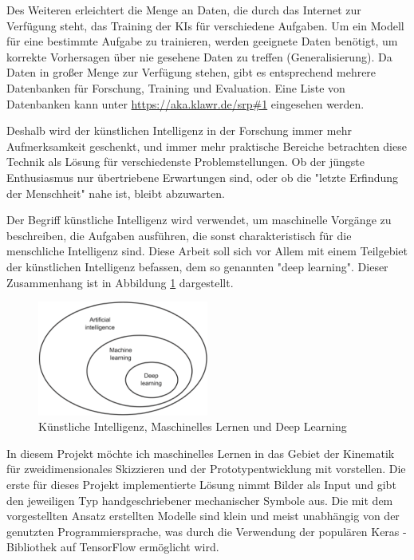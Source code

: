 Des Weiteren erleichtert die Menge an Daten, die durch das Internet zur Verfügung steht, das Training der KIs für verschiedene Aufgaben.
Um ein Modell für eine bestimmte Aufgabe zu trainieren, werden geeignete Daten benötigt, um korrekte Vorhersagen über nie gesehene Daten zu treffen (Generalisierung).
Da Daten in großer Menge zur Verfügung stehen, gibt es entsprechend mehrere Datenbanken für Forschung, Training und Evaluation.
Eine Liste von Datenbanken kann unter \url{https://aka.klawr.de/srp\#1} eingesehen werden.

Deshalb wird der künstlichen Intelligenz in der Forschung immer mehr Aufmerksamkeit geschenkt, und immer mehr praktische Bereiche betrachten diese Technik als Lösung für verschiedenste Problemstellungen.
Ob der jüngste Enthusiasmus nur übertriebene Erwartungen sind, oder ob die "letzte Erfindung der Menschheit" \cite{Good1965} nahe ist, bleibt abzuwarten.

Der Begriff künstliche Intelligenz wird verwendet, um maschinelle Vorgänge zu beschreiben, die Aufgaben ausführen, die sonst charakteristisch für die menschliche Intelligenz sind.
Diese Arbeit soll sich vor Allem mit einem Teilgebiet der künstlichen Intelligenz befassen, dem so genannten "deep learning".
Dieser Zusammenhang ist in Abbildung \ref{fig:ai_ml_dl} dargestellt.

\begin{figure}
    \includegraphics[width=0.5\textwidth]{images/ai_ml_dl.png}
    \caption{Künstliche Intelligenz, Maschinelles Lernen und Deep Learning \cite[p.4]{Chollet2017}}
    \label{fig:ai_ml_dl}
\end{figure}

In diesem Projekt möchte ich maschinelles Lernen in das Gebiet der Kinematik für zweidimensionales Skizzieren und der Prototypentwicklung mit  vorstellen.
Die erste für dieses Projekt implementierte Lösung nimmt Bilder als Input und gibt den jeweiligen Typ handgeschriebener mechanischer Symbole aus.
Die mit dem vorgestellten Ansatz erstellten Modelle sind klein und meist unabhängig von der genutzten Programmiersprache, was durch die Verwendung der populären Keras \cite{Chollet}-Bibliothek auf TensorFlow \cite{Google2019} ermöglicht wird.

